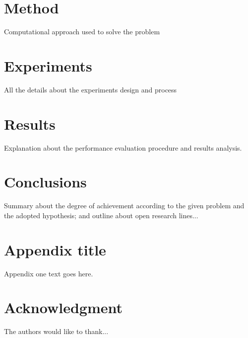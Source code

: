 \documentclass[journal,onecolumn]{IEEEtran}
\begin{document}
\section{Method}

Computational approach used to solve the problem

\section{Experiments}

All the details about the experiments design and process

\section{Results}
Explanation about the performance evaluation procedure and results analysis.

\section{Conclusions}

Summary about the degree of achievement according to the given problem and the adopted hypothesis; and outline about open research lines...


\appendices
\section{Appendix title}
Appendix one text goes here.


\section*{Acknowledgment}


The authors would like to thank...


\ifCLASSOPTIONcaptionsoff
  \newpage
\fi




\end{document}
